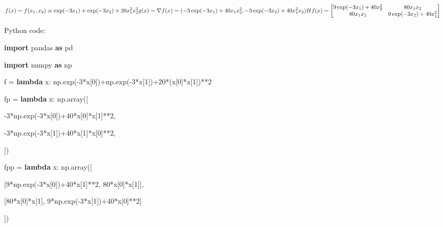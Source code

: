 \documentclass[
]{article}
\newenvironment{Shaded}{}{}
\newcommand{\DecValTok}[1]{\textcolor[rgb]{0.25,0.63,0.44}{#1}}
\newcommand{\ImportTok}[1]{\textcolor[rgb]{0.00,0.50,0.00}{\textbf{#1}}}
\newcommand{\KeywordTok}[1]{\textcolor[rgb]{0.00,0.44,0.13}{\textbf{#1}}}
\newcommand{\NormalTok}[1]{#1}
\newcommand{\OperatorTok}[1]{\textcolor[rgb]{0.40,0.40,0.40}{#1}}
\begin{document}
\begin{enumerate}
  \[f(x)=f(x_1,x_2)\equiv \exp(-3x_1)+\exp(-3x_2)+20x_1^2x_2^2\\

  g(x)=\nabla f(x)=(-3\exp (-3x_1)+40x_1x_2^2,-3\exp(-3x_2)+40x_1^2x_2)\\

  Hf(x)=\begin{bmatrix}

  9\exp(-3x_1)+40x_2^2&80x_1x_2\\

  80x_1x_2&9\exp(-3x_2)+40x_1^2

  \end{bmatrix}\]

  Python code:

\begin{Shaded}
\begin{Highlighting}[]
\ImportTok{import}\NormalTok{ pandas }\ImportTok{as}\NormalTok{ pd
}
\ImportTok{import}\NormalTok{ numpy }\ImportTok{as}\NormalTok{ np
}


\NormalTok{f }\OperatorTok{=} \KeywordTok{lambda}\NormalTok{ x: np.exp(}\OperatorTok{{-}}\DecValTok{3}\OperatorTok{*}\NormalTok{x[}\DecValTok{0}\NormalTok{])}\OperatorTok{+}\NormalTok{np.exp(}\OperatorTok{{-}}\DecValTok{3}\OperatorTok{*}\NormalTok{x[}\DecValTok{1}\NormalTok{])}\OperatorTok{+}\DecValTok{20}\OperatorTok{*}\NormalTok{(x[}\DecValTok{0}\NormalTok{]}\OperatorTok{*}\NormalTok{x[}\DecValTok{1}\NormalTok{])}\OperatorTok{**}\DecValTok{2}

\NormalTok{fp }\OperatorTok{=} \KeywordTok{lambda}\NormalTok{ x: np.array([
}
    \OperatorTok{{-}}\DecValTok{3}\OperatorTok{*}\NormalTok{np.exp(}\OperatorTok{{-}}\DecValTok{3}\OperatorTok{*}\NormalTok{x[}\DecValTok{0}\NormalTok{])}\OperatorTok{+}\DecValTok{40}\OperatorTok{*}\NormalTok{x[}\DecValTok{0}\NormalTok{]}\OperatorTok{*}\NormalTok{x[}\DecValTok{1}\NormalTok{]}\OperatorTok{**}\DecValTok{2}\NormalTok{,
}
    \OperatorTok{{-}}\DecValTok{3}\OperatorTok{*}\NormalTok{np.exp(}\OperatorTok{{-}}\DecValTok{3}\OperatorTok{*}\NormalTok{x[}\DecValTok{1}\NormalTok{])}\OperatorTok{+}\DecValTok{40}\OperatorTok{*}\NormalTok{x[}\DecValTok{1}\NormalTok{]}\OperatorTok{*}\NormalTok{x[}\DecValTok{0}\NormalTok{]}\OperatorTok{**}\DecValTok{2}\NormalTok{,
}
\NormalTok{])
}
\NormalTok{fpp }\OperatorTok{=} \KeywordTok{lambda}\NormalTok{ x: np.array([
}
\NormalTok{    [}\DecValTok{9}\OperatorTok{*}\NormalTok{np.exp(}\OperatorTok{{-}}\DecValTok{3}\OperatorTok{*}\NormalTok{x[}\DecValTok{0}\NormalTok{])}\OperatorTok{+}\DecValTok{40}\OperatorTok{*}\NormalTok{x[}\DecValTok{1}\NormalTok{]}\OperatorTok{**}\DecValTok{2}\NormalTok{, }\DecValTok{80}\OperatorTok{*}\NormalTok{x[}\DecValTok{0}\NormalTok{]}\OperatorTok{*}\NormalTok{x[}\DecValTok{1}\NormalTok{]],
}
\NormalTok{    [}\DecValTok{80}\OperatorTok{*}\NormalTok{x[}\DecValTok{0}\NormalTok{]}\OperatorTok{*}\NormalTok{x[}\DecValTok{1}\NormalTok{], }\DecValTok{9}\OperatorTok{*}\NormalTok{np.exp(}\OperatorTok{{-}}\DecValTok{3}\OperatorTok{*}\NormalTok{x[}\DecValTok{1}\NormalTok{])}\OperatorTok{+}\DecValTok{40}\OperatorTok{*}\NormalTok{x[}\DecValTok{0}\NormalTok{]}\OperatorTok{**}\DecValTok{2}\NormalTok{]
}
\NormalTok{])
}



\end{Highlighting}
\end{Shaded}
\end{enumerate}
\end{document}
